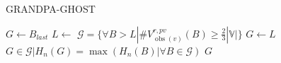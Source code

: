 \begin{algorithm}
\caption{GRANDPA-GHOST}
\begin{algorithmic}
    
        \state $G \leftarrow B_{last}$
    \else
        \state $L \leftarrow$ 
        \state $\mathcal{G} = \{ \forall B > L | \#V_{\operatorname{obs}(v)}^{r, pv}(B) \geqslant \frac{2}{3} |\mathbb{V}| \}$
            \state $G \leftarrow L$
        \else
            \state $G \in \mathcal{G} | H_n(G) = \operatorname{max}\left( H_n (B) | \forall B \in \mathcal{G} \right)$
        \endif
    \endif
    \return $G$
\end{algorithmic}
\end{algorithm}